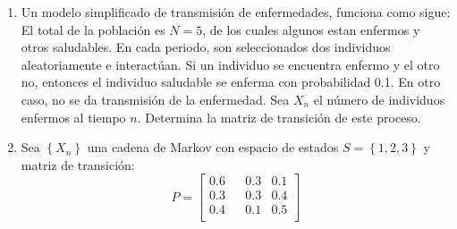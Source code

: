 \documentclass{report}
\begin{document}
\begin{enumerate}
    \item Un modelo simplificado de transmisión de enfermedades, funciona como sigue: El total de la población es $N=5$, de los cuales algunos estan enfermos y otros saludables. En cada periodo, son seleccionados dos individuos aleatoriamente e interactúan. Si un individuo se encuentra enfermo y el otro no, entonces el individuo saludable se enferma con probabilidad 0.1. En otro caso, no se da transmisión de la enfermedad. Sea $X_n$ el número de individuos enfermos al tiempo $n$. Determina la matriz de transición de este proceso.
    \item Sea $\left\{X_n\right\}$ una cadena de Markov con espacio de estados $S = \left\{1,2,3\right\}$ y matriz de transición:
          $$P= \left[
                  \begin{matrix}
                      0.6 &  & 0.3 & 0.1 \\
                      0.3 &  & 0.3 & 0.4 \\
                      0.4 &  & 0.1 & 0.5 \\
                  \end{matrix}
                  \right]
          $$
          

\end{enumerate}
\end{document}

